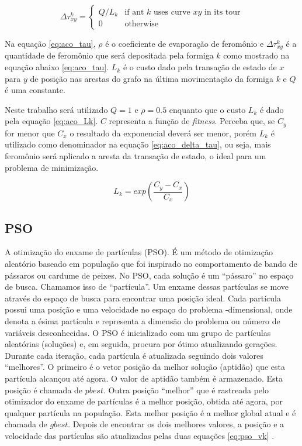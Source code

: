 \begin{equation}
\label{eq:aco_delta_tau}
    \Delta{\tau^{k}_{xy}} =
    \begin{cases}
    Q/L_k & \mbox{if ant }k\mbox{ uses curve }xy\mbox{ in its tour} \\
    0 & \mbox{otherwise}
    \end{cases}
\end{equation}

Na equação \ref{eq:aco_tau}, $\rho$ é o coeficiente de evaporação de feromônio e $\Delta \tau _{xy}^{k}$ é a quantidade de feromônio que será depositada pela formiga $k$ como mostrado na equação abaixo \ref{eq:aco_tau}. $L_{k}$ é o custo dado pela transação de estado de $x$ para $y$ de posição nas arestas do grafo na última movimentação da formiga $k$ e $Q$ é uma constante. 

Neste trabalho será utilizado $Q = 1$  e $\rho = 0.5$ enquanto que o custo $L_{k}$ é dado pela equação \ref{eq:aco_Lk}. $C$ representa a função de \textit{fitness}. Perceba que, se $C_y$ for menor que $C_x$ o resultado da exponencial deverá ser menor, porém $L_{k}$ é utilizado como denominador na equação \ref{eq:aco_delta_tau}, ou seja, mais feromônio será aplicado a aresta da transação de estado, o ideal para um problema de minimização.

\begin{equation}
\label{eq:aco_Lk}
    L_{k} =
    exp(\frac{C_y - C_x}{C_x})
\end{equation}

\subsection{PSO}
\label{subsec:pso}

A otimização do enxame de partículas (PSO). É um método de otimização aleatório baseado em população que foi inspirado no comportamento de bando de pássaros ou cardume de peixes. No PSO, cada solução é um “pássaro” no espaço de busca. Chamamos isso de “partícula”. Um enxame dessas partículas se move através do espaço de busca para encontrar uma posição ideal. Cada partícula possui uma posição e uma velocidade no espaço do problema -dimensional, onde denota a ésima partícula e representa a dimensão do problema ou número de variáveis desconhecidas. O PSO é inicializado com um grupo de partículas aleatórias (soluções) e, em seguida, procura por ótimo atualizando gerações. Durante cada iteração, cada partícula é atualizada seguindo dois valores “melhores”. O primeiro é o vetor posição da melhor solução (aptidão) que esta partícula alcançou até agora. O valor de aptidão também é armazenado. Esta posição é chamada de $pbest$. Outra posição “melhor” que é rastreada pelo otimizador do enxame de partículas é a melhor posição, obtida até agora, por qualquer partícula na população. Esta melhor posição é a melhor global atual e é chamada de $gbest$. Depois de encontrar os dois melhores valores, a posição e a velocidade das partículas são atualizadas pelas duas equações \ref{eq:pso_vk} \cite{jaberipour2011particle}.

